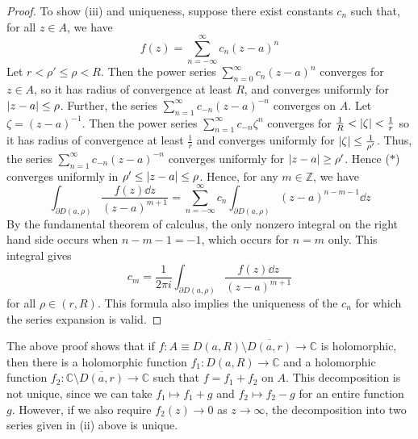 \begin{proof}
	To show (iii) and uniqueness, suppose there exist constants \( c_n \) such that, for all \( z \in A \), we have
	\begin{equation}
		f(z) = \sum_{n=-\infty}^\infty c_n (z-a)^n \tag{\(\ast\)}
	\end{equation}
	Let \( r < \rho' \leq \rho < R \).
	Then the power series \( \sum_{n=0}^\infty c_n (z-a)^n \) converges for \( z \in A \), so it has radius of convergence at least \( R \), and converges uniformly for \( \abs{z-a} \leq \rho \).
	Further, the series \( \sum_{n=1}^\infty c_{-n} (z-a)^{-n} \) converges on \( A \).
	Let \( \zeta = (z-a)^{-1} \).
	Then the power series \( \sum_{n=1}^\infty c_{-n} \zeta^n \) converges for \( \frac{1}{R} < \abs{\zeta} < \frac{1}{r} \) so it has radius of convergence at least \( \frac{1}{r} \) and converges uniformly for \( \abs{\zeta} \leq \frac{1}{\rho'} \).
	Thus, the series \( \sum_{n=1}^\infty c_{-n} (z-a)^{-n} \) converges uniformly for \( \abs{z-a} \geq \rho' \).
	Hence (\(\ast\)) converges uniformly in \( \rho' \leq \abs{z-a} \leq \rho \).
	Hence, for any \( m \in \mathbb Z \), we have
	\[
		\int_{\partial D(a,\rho)} \frac{f(z) \dd{z}}{(z-a)^{m+1}} = \sum_{n=-\infty}^\infty c_n \int_{\partial D(a,\rho)} (z-a)^{n-m-1} \dd{z}
	\]
	By the fundamental theorem of calculus, the only nonzero integral on the right hand side occurs when \( n - m - 1 = -1 \), which occurs for \( n = m \) only.
	This integral gives
	\[
		c_m = \frac{1}{2\pi i} \int_{\partial D(a,\rho)} \frac{f(z) \dd{z}}{(z-a)^{m+1}}
	\]
	for all \( \rho \in (r,R) \).
	This formula also implies the uniqueness of the \( c_n \) for which the series expansion is valid.
\end{proof}
\begin{remark}
	The above proof shows that if \( f \colon A \equiv D(a,R)\setminus \overline{D(a,r)} \to \mathbb C \) is holomorphic, then there is a holomorphic function \( f_1 \colon D(a,R) \to \mathbb C \) and a holomorphic function \( f_2 \colon \mathbb C \setminus \overline{D(a,r)} \to \mathbb C \) such that \( f = f_1 + f_2 \) on \( A \).
	This decomposition is not unique, since we can take \( f_1 \mapsto f_1 + g \) and \( f_2 \mapsto f_2 - g \) for an entire function \( g \).
	However, if we also require \( f_2(z) \to 0 \) as \( z \to \infty \), the decomposition into two series given in (ii) above is unique.
\end{remark}

